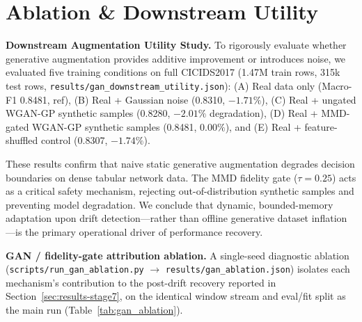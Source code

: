 \documentclass[conference]{IEEEtran}
\begin{document}
\section{Ablation \& Downstream Utility}

\textbf{Downstream Augmentation Utility Study.}
To rigorously evaluate whether generative augmentation provides additive improvement or introduces noise, we evaluated five training conditions on full CICIDS2017 (1.47M train rows, 315k test rows, \texttt{results/gan\_downstream\_utility.json}):
(A) Real data only (Macro-F1 0.8481, ref),
(B) Real + Gaussian noise (0.8310, $-1.71\%$),
(C) Real + ungated WGAN-GP synthetic samples (0.8280, $\mathbf{-2.01\%}$ degradation),
(D) Real + MMD-gated WGAN-GP synthetic samples (0.8481, $0.00\%$), and
(E) Real + feature-shuffled control (0.8307, $-1.74\%$).

These results confirm that naive static generative augmentation degrades decision boundaries on dense tabular network data. The MMD fidelity gate ($\tau=0.25$) acts as a critical safety mechanism, rejecting out-of-distribution synthetic samples and preventing model degradation. We conclude that dynamic, bounded-memory adaptation upon drift detection---rather than offline generative dataset inflation---is the primary operational driver of performance recovery.

\textbf{GAN / fidelity-gate attribution ablation.} A single-seed diagnostic ablation
(\texttt{scripts/run\_gan\_ablation.py} $\rightarrow$ \texttt{results/gan\_ablation.json}) isolates
each mechanism's contribution to the post-drift recovery reported in
Section~\ref{sec:results-stage7}, on the identical window stream and eval/fit split as the main
run (Table~\ref{tab:gan_ablation}).

\begin{table}[!t]
\centering
\caption{GAN/fidelity-gate attribution ablation (single-seed, seed=0)}
\label{tab:gan_ablation}
\end{table}
\end{document}
